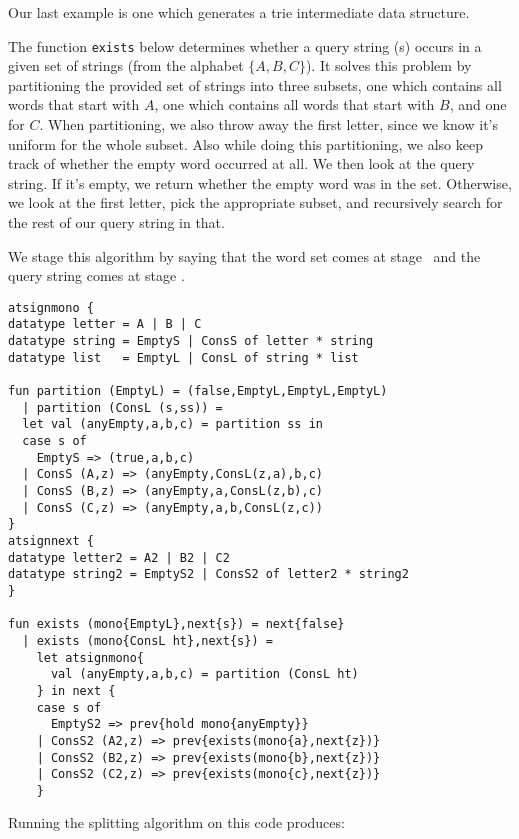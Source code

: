 Our last example is one which generates a trie intermediate data structure.

The function {\tt exists} below determines whether a query string (s) occurs in a given set of strings (from the alphabet $\{A, B,C\}$).
It solves this problem by partitioning the provided set of strings into three subsets,
one which contains all words that start with $A$,
one which contains all words that start with $B$, and one for $C$.
When partitioning, we also throw away the first letter, since we know it's uniform for the whole subset.
Also while doing this partitioning, we also keep track of whether the empty word occurred at all.
We then look at the query string.  If it's empty, we return whether the empty word was in the set.
Otherwise, we look at the first letter, pick the appropriate subset, 
and recursively search for the rest of our query string in that.

We stage this algorithm by saying that the word set comes at stage \bbone\
and the query string comes at stage \bbtwo.

\begin{lstlisting} 
atsignmono { 
datatype letter = A | B | C 
datatype string = EmptyS | ConsS of letter * string
datatype list   = EmptyL | ConsL of string * list

fun partition (EmptyL) = (false,EmptyL,EmptyL,EmptyL) 
  | partition (ConsL (s,ss)) = 
  let val (anyEmpty,a,b,c) = partition ss in 
  case s of 
    EmptyS => (true,a,b,c) 
  | ConsS (A,z) => (anyEmpty,ConsL(z,a),b,c) 
  | ConsS (B,z) => (anyEmpty,a,ConsL(z,b),c) 
  | ConsS (C,z) => (anyEmpty,a,b,ConsL(z,c)) 
}
atsignnext { 
datatype letter2 = A2 | B2 | C2
datatype string2 = EmptyS2 | ConsS2 of letter2 * string2
}

fun exists (mono{EmptyL},next{s}) = next{false} 
  | exists (mono{ConsL ht},next{s}) = 
	let atsignmono{
	  val (anyEmpty,a,b,c) = partition (ConsL ht)
	} in next { 
	case s of 
	  EmptyS2 => prev{hold mono{anyEmpty}} 
	| ConsS2 (A2,z) => prev{exists(mono{a},next{z})} 
	| ConsS2 (B2,z) => prev{exists(mono{b},next{z})}
	| ConsS2 (C2,z) => prev{exists(mono{c},next{z})}  
	} 
\end{lstlisting}

\noindent
Running the splitting algorithm on this code produces:

